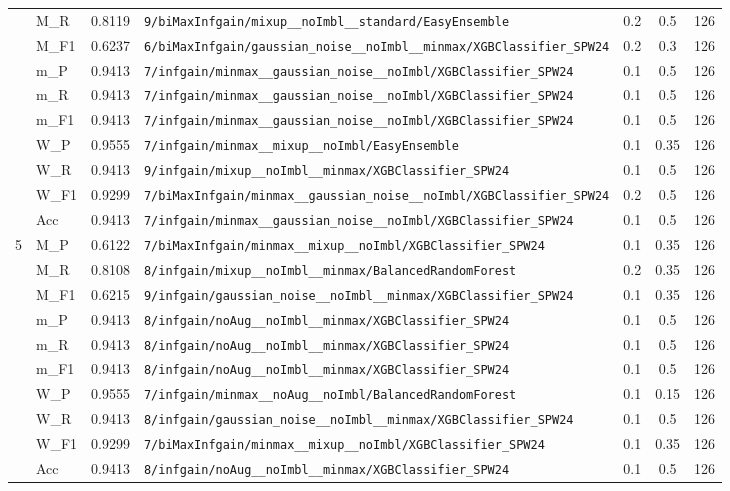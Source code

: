 \begin{table}[htbp]
\begin{tabular}{|c|l|c|>{\ttfamily\footnotesize}p{7.2cm}|c|c|c|}
 & M\_R & 0.8119 & \texttt{9/biMaxInfgain/mixup\_\_noImbl\_\_standard/EasyEnsemble} & 0.2 & 0.5  & 126 \\ 
 & M\_F1 & 0.6237 & \texttt{6/biMaxInfgain/gaussian\_noise\_\_noImbl\_\_minmax/XGBClassifier\_SPW24} & 0.2 & 0.3  & 126 \\ 
 & m\_P & 0.9413 & \texttt{7/infgain/minmax\_\_gaussian\_noise\_\_noImbl/XGBClassifier\_SPW24} & 0.1 & 0.5  & 126 \\ 
 & m\_R & 0.9413 & \texttt{7/infgain/minmax\_\_gaussian\_noise\_\_noImbl/XGBClassifier\_SPW24} & 0.1 & 0.5  & 126 \\ 
 & m\_F1 & 0.9413 & \texttt{7/infgain/minmax\_\_gaussian\_noise\_\_noImbl/XGBClassifier\_SPW24} & 0.1 & 0.5  & 126 \\ 
 & W\_P & 0.9555 & \texttt{7/infgain/minmax\_\_mixup\_\_noImbl/EasyEnsemble} & 0.1 & 0.35  & 126 \\ 
 & W\_R & 0.9413 & \texttt{9/infgain/mixup\_\_noImbl\_\_minmax/XGBClassifier\_SPW24} & 0.1 & 0.5  & 126 \\ 
 & W\_F1 & 0.9299 & \texttt{7/biMaxInfgain/minmax\_\_gaussian\_noise\_\_noImbl/XGBClassifier\_SPW24} & 0.2 & 0.5  & 126 \\ 
 & Acc & 0.9413 & \texttt{7/infgain/minmax\_\_gaussian\_noise\_\_noImbl/XGBClassifier\_SPW24} & 0.1 & 0.5  & 126 \\ 
\hline
\multirow{10}{*}{5} & M\_P & 0.6122 & \texttt{7/biMaxInfgain/minmax\_\_mixup\_\_noImbl/XGBClassifier\_SPW24} & 0.1 & 0.35  & 126 \\ 
 & M\_R & 0.8108 & \texttt{8/infgain/mixup\_\_noImbl\_\_minmax/BalancedRandomForest} & 0.2 & 0.35  & 126 \\ 
 & M\_F1 & 0.6215 & \texttt{9/infgain/gaussian\_noise\_\_noImbl\_\_minmax/XGBClassifier\_SPW24} & 0.1 & 0.35  & 126 \\ 
 & m\_P & 0.9413 & \texttt{8/infgain/noAug\_\_noImbl\_\_minmax/XGBClassifier\_SPW24} & 0.1 & 0.5  & 126 \\ 
 & m\_R & 0.9413 & \texttt{8/infgain/noAug\_\_noImbl\_\_minmax/XGBClassifier\_SPW24} & 0.1 & 0.5  & 126 \\ 
 & m\_F1 & 0.9413 & \texttt{8/infgain/noAug\_\_noImbl\_\_minmax/XGBClassifier\_SPW24} & 0.1 & 0.5  & 126 \\ 
 & W\_P & 0.9555 & \texttt{7/infgain/minmax\_\_noAug\_\_noImbl/BalancedRandomForest} & 0.1 & 0.15  & 126 \\ 
 & W\_R & 0.9413 & \texttt{8/infgain/gaussian\_noise\_\_noImbl\_\_minmax/XGBClassifier\_SPW24} & 0.1 & 0.5  & 126 \\ 
 & W\_F1 & 0.9299 & \texttt{7/biMaxInfgain/minmax\_\_mixup\_\_noImbl/XGBClassifier\_SPW24} & 0.1 & 0.35  & 126 \\ 
 & Acc & 0.9413 & \texttt{8/infgain/noAug\_\_noImbl\_\_minmax/XGBClassifier\_SPW24} & 0.1 & 0.5  & 126 \\ 
\hline
\end{tabular}
\end{table}
